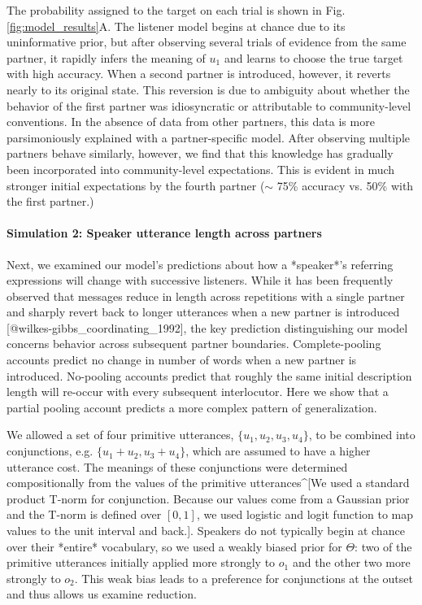 \documentclass[11pt, floatsintext]{apa6}
\begin{document}
The probability assigned to the target on each trial is shown in Fig. \ref{fig:model_results}A.
The listener model begins at chance due to its uninformative prior, but after observing several trials of evidence from the same partner, it rapidly infers the meaning of $u_1$ and learns to choose the true target with high accuracy.
When a second partner is introduced, however, it reverts nearly to its original state.
This reversion is due to ambiguity about whether the behavior of the first partner was idiosyncratic or attributable to community-level conventions.
In the absence of data from other partners, this data is more parsimoniously explained with a partner-specific model.
After observing multiple partners behave similarly, however, we find that this knowledge has gradually been incorporated into community-level expectations. 
This is evident in much stronger initial expectations by the fourth partner ($\sim$ 75\% accuracy vs. 50\% with the first partner.)

\paragraph{Simulation 2: Speaker utterance length across partners}

Next, we examined our model's predictions about how a *speaker*'s referring expressions will change with successive listeners.
While it has been frequently observed that messages reduce in length across repetitions with a single partner and sharply revert back to longer utterances when a new partner is introduced [@wilkes-gibbs_coordinating_1992], the key prediction distinguishing our model concerns behavior across subsequent partner boundaries.
Complete-pooling accounts predict no change in number of words when a new partner is introduced.
No-pooling accounts predict that roughly the same initial description length will re-occur with every subsequent interlocutor. 
Here we show that a partial pooling account predicts a more complex pattern of generalization.

We allowed a set of four primitive utterances, $\{u_1, u_2, u_3, u_4\}$, to be combined into conjunctions, e.g. $\{u_1+u_2, u_3+u_4\}$, which are assumed to have a higher utterance cost.
The meanings of these conjunctions were determined compositionally from the values of the primitive utterances^[We used a standard product T-norm for conjunction. Because our values come from a Gaussian prior and the T-norm is defined over $[0,1]$, we used logistic and logit function to map values to the unit interval and back.].
Speakers do not typically begin at chance over their *entire* vocabulary, so we used a weakly biased prior for $\Theta$: two of the primitive utterances initially applied more strongly to $o_1$ and the other two more strongly to $o_2$.
This weak bias leads to a preference for conjunctions at the outset and thus allows us examine reduction.
\end{document}
